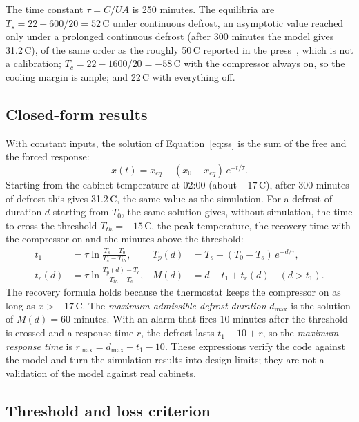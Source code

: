 \documentclass{ceurart}
\newcommand{\degC}{\,\textdegree{}C}
\begin{document}
The time constant $\tau = C/UA$ is 250 minutes.
The equilibria are $T_s = 22 + 600/20 = 52$\degC{} under continuous defrost, an asymptotic value reached only under a prolonged continuous defrost (after 300 minutes the model gives 31.2\degC), of the same order as the roughly 50\degC{} reported in the press~\cite{fatto2026francia}, which is not a calibration; $T_c = 22 - 1600/20 = -58$\degC{} with the compressor always on, so the cooling margin is ample; and 22\degC{} with everything off.

\subsection{Closed-form results}

With constant inputs, the solution of Equation~\eqref{eq:ss} is the sum of the free and the forced response:
\begin{equation}
  x(t) = x_{eq} + (x_0 - x_{eq})\,e^{-t/\tau}.
\end{equation}
Starting from the cabinet temperature at 02:00 (about $-17$\degC), after 300 minutes of defrost this gives 31.2\degC, the same value as the simulation.
For a defrost of duration $d$ starting from $T_0$, the same solution gives, without simulation, the time to cross the threshold $T_{th} = -15$\degC, the peak temperature, the recovery time with the compressor on and the minutes above the threshold:
\begin{align}
  t_1 &= \tau \ln\frac{T_s - T_0}{T_s - T_{th}}, &
  T_p(d) &= T_s + (T_0 - T_s)\,e^{-d/\tau}, \\
  t_r(d) &= \tau \ln\frac{T_p(d) - T_c}{T_{th} - T_c}, &
  M(d) &= d - t_1 + t_r(d) \quad (d > t_1).
\end{align}
The recovery formula holds because the thermostat keeps the compressor on as long as $x > -17$\degC.
The \emph{maximum admissible defrost duration} $d_{\max}$ is the solution of $M(d) = 60$ minutes.
With an alarm that fires 10 minutes after the threshold is crossed and a response time $r$, the defrost lasts $t_1 + 10 + r$, so the \emph{maximum response time} is $r_{\max} = d_{\max} - t_1 - 10$.
These expressions verify the code against the model and turn the simulation results into design limits; they are not a validation of the model against real cabinets.

\subsection{Threshold and loss criterion}
\end{document}
